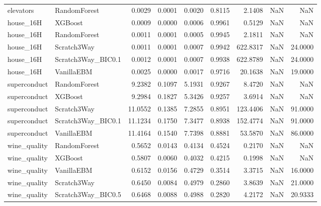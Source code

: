 \begin{tabular}{llrrrrrrr}
elevators & RandomForest & 0.0029 & 0.0001 & 0.0020 & 0.8115 & 2.1408 & NaN & NaN \\
house_16H & XGBoost & 0.0009 & 0.0000 & 0.0006 & 0.9961 & 0.5129 & NaN & NaN \\
house_16H & RandomForest & 0.0011 & 0.0001 & 0.0005 & 0.9945 & 2.1811 & NaN & NaN \\
house_16H & Scratch3Way & 0.0011 & 0.0001 & 0.0007 & 0.9942 & 622.8317 & NaN & 24.0000 \\
house_16H & Scratch3Way_BIC0.1 & 0.0012 & 0.0001 & 0.0007 & 0.9938 & 622.8789 & NaN & 24.0000 \\
house_16H & VanillaEBM & 0.0025 & 0.0000 & 0.0017 & 0.9716 & 20.1638 & NaN & 19.0000 \\
superconduct & RandomForest & 9.2382 & 0.1097 & 5.1931 & 0.9267 & 8.4720 & NaN & NaN \\
superconduct & XGBoost & 9.2984 & 0.1827 & 5.3426 & 0.9257 & 3.6914 & NaN & NaN \\
superconduct & Scratch3Way & 11.0552 & 0.1385 & 7.2855 & 0.8951 & 123.4406 & NaN & 91.0000 \\
superconduct & Scratch3Way_BIC0.1 & 11.1234 & 0.1750 & 7.3477 & 0.8938 & 152.4774 & NaN & 91.0000 \\
superconduct & VanillaEBM & 11.4164 & 0.1540 & 7.7398 & 0.8881 & 53.5870 & NaN & 86.0000 \\
wine_quality & RandomForest & 0.5652 & 0.0143 & 0.4134 & 0.4524 & 0.2170 & NaN & NaN \\
wine_quality & XGBoost & 0.5807 & 0.0060 & 0.4032 & 0.4215 & 0.1998 & NaN & NaN \\
wine_quality & VanillaEBM & 0.6152 & 0.0156 & 0.4729 & 0.3514 & 3.3715 & NaN & 16.0000 \\
wine_quality & Scratch3Way & 0.6450 & 0.0084 & 0.4979 & 0.2860 & 3.8639 & NaN & 21.0000 \\
wine_quality & Scratch3Way_BIC0.5 & 0.6468 & 0.0088 & 0.4988 & 0.2820 & 4.2172 & NaN & 20.9333 \\
\bottomrule
\end{tabular}
